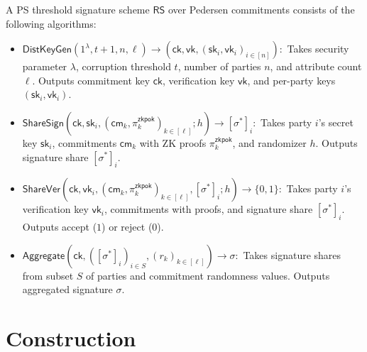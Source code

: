 \begin{definition}
A PS threshold signature scheme $\mathsf{RS}$ over Pedersen commitments consists of the following algorithms:
\begin{itemize}
    \item $\mathsf{DistKeyGen}(1^{\lambda}, t+1, n, \ell) \to (\mathsf{ck}, \mathsf{vk}, (\mathsf{sk}_i, \mathsf{vk}_i)_{i \in [n]}):$ Takes security parameter $\lambda$, corruption threshold $t$, number of parties $n$, and attribute count $\ell$. Outputs commitment key $\mathsf{ck}$, verification key $\mathsf{vk}$, and per-party keys $(\mathsf{sk}_i, \mathsf{vk}_i)$.
    \item $\mathsf{ShareSign}(\mathsf{ck}, \mathsf{sk}_i, (\mathsf{cm}_k, \pi_k^{\mathsf{zkpok}})_{k \in [\ell]}; h) \to [\sigma^*]_i:$ Takes party $i$'s secret key $\mathsf{sk}_i$, commitments $\mathsf{cm}_k$ with ZK proofs $\pi_k^{\mathsf{zkpok}}$, and randomizer $h$. Outputs signature share $[\sigma^*]_i$.
    \item $\mathsf{ShareVer}(\mathsf{ck}, \mathsf{vk}_i, (\mathsf{cm}_k, \pi_k^{\mathsf{zkpok}})_{k \in [\ell]}, [\sigma^*]_i; h) \to \{0,1\}:$ Takes party $i$'s verification key $\mathsf{vk}_i$, commitments with proofs, and signature share $[\sigma^*]_i$. Outputs accept ($1$) or reject ($0$).
    \item $\mathsf{Aggregate}(\mathsf{ck}, ([\sigma^*]_i)_{i \in S}, (r_k)_{k \in [\ell]}) \to \sigma:$ Takes signature shares from subset $S$ of parties and commitment randomness values. Outputs aggregated signature $\sigma$.
\end{itemize}
\end{definition}

\section{Construction}
\label{sec:threshold-construction}

